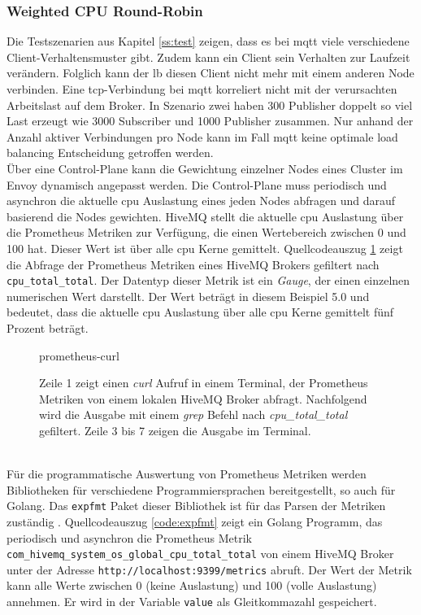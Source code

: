 \subsubsection{Weighted CPU Round-Robin} \label{ss:weighted-cpu}
Die Testszenarien aus Kapitel \ref{ss:test} zeigen, dass es bei \ac{mqtt} viele verschiedene Client-Verhaltensmuster gibt. Zudem kann ein Client sein Verhalten zur Laufzeit verändern.
Folglich kann der \acl{lb} diesen Client nicht mehr mit einem anderen Node verbinden.
Eine \ac{tcp}-Verbindung bei \ac{mqtt} korreliert nicht mit der verursachten Arbeitslast auf dem Broker. In Szenario zwei haben 300 Publisher doppelt so viel Last erzeugt wie 3000 Subscriber und 1000 Publisher zusammen.
Nur anhand der Anzahl aktiver Verbindungen pro Node kann im Fall \ac{mqtt} keine optimale load balancing Entscheidung getroffen werden.
\\
Über eine Control-Plane kann die Gewichtung einzelner Nodes eines Cluster im Envoy dynamisch angepasst werden.
Die Control-Plane muss periodisch und asynchron die aktuelle \ac{cpu} Auslastung eines jeden Nodes abfragen und darauf basierend die Nodes gewichten.
HiveMQ stellt die aktuelle \ac{cpu} Auslastung über die Prometheus Metriken zur Verfügung, die einen Wertebereich zwischen 0 und 100 hat. Dieser Wert ist über alle \ac{cpu} Kerne gemittelt.
Quellcodeauszug \ref{code:prometheus-curl} zeigt die Abfrage der Prometheus Metriken eines HiveMQ Brokers gefiltert nach \verb|cpu_total_total|. Der Datentyp dieser Metrik ist ein \textit{Gauge}, der einen einzelnen numerischen Wert darstellt.\cite{prometheusMetricTypesPrometheus} Der Wert beträgt in diesem Beispiel 5.0 und bedeutet, dass die aktuelle \ac{cpu} Auslastung über alle \ac{cpu} Kerne gemittelt fünf Prozent beträgt.
\begin{figure}
    {prometheus-curl}
    \caption{Zeile 1 zeigt einen \textit{curl} Aufruf in einem Terminal, der Prometheus Metriken von einem lokalen HiveMQ Broker abfragt. Nachfolgend wird die Ausgabe mit einem \textit{grep} Befehl nach \textit{cpu\_total\_total} gefiltert. Zeile 3 bis 7 zeigen die Ausgabe im Terminal.}
    \label{code:prometheus-curl}
\end{figure}
\\
Für die programmatische Auswertung von Prometheus Metriken werden Bibliotheken für verschiedene Programmiersprachen bereitgestellt, so auch für Golang.
Das \verb|expfmt| Paket dieser Bibliothek ist für das Parsen der Metriken zuständig \cite{ExpfmtPkgGo}.
Quellcodeauszug \ref{code:expfmt} zeigt ein Golang Programm, das periodisch und asynchron die Prometheus Metrik \verb|com_hivemq_system_os_global_cpu_total_total| von einem HiveMQ Broker unter der Adresse \verb|http://localhost:9399/metrics| abruft. Der Wert der Metrik kann alle Werte zwischen 0 (keine Auslastung) und 100 (volle Auslastung) annehmen. Er wird in der Variable \verb|value| als Gleitkommazahl gespeichert.
